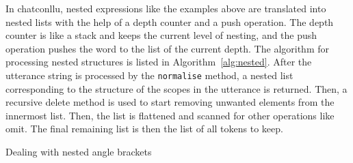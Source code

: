In chatconllu, nested expressions like the examples above are translated into nested lists with the help of a depth counter and a push operation. The depth counter is like a stack and keeps the current level of nesting, and the push operation pushes the word to the list of the current depth. The algorithm for processing nested structures is listed in Algorithm~\ref{alg:nested}. After the utterance string is processed by the \texttt{normalise} method, a nested list corresponding to the structure of the scopes in the utterance is returned. Then, a recursive delete method is used to start removing unwanted elements from the innermost list. Then, the list is flattened and scanned for other operations like omit. The final remaining list is then the list of all tokens to keep.
\clearpage
{}
\renewcommand{\CommentSty}[1]{\textnormal{\ttfamily\color{blue!50!black}#1}\unskip}
\LinesNotNumbered
\DontPrintSemicolon
\begin{algorithm}[H]\label{alg:nested}
\caption{Dealing with nested angle brackets}
  \;
\end{algorithm}

